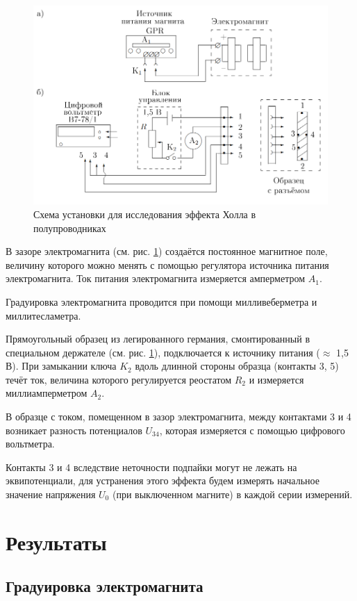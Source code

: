 \documentclass[12pt,a4paper]{article}
\newcommand{\figref}[1]{(см. рис. \ref{#1})}
\begin{document}
	\begin{figure}[h]
		\includegraphics[scale=0.65]{res/scheme.png}
		\caption{Схема установки для исследования эффекта Холла в полупроводниках}
		\label{scheme}
	\end{figure}
	
	В зазоре электромагнита \figref{scheme} создаётся постоянное магнитное поле, величину которого можно менять с помощью регуля­тора источника питания электромагнита. Ток питания электромагни­та измеряется амперметром $A_1$.
	
	Градуировка электромагнита проводится при помощи милливеберметра и миллитесламетра.
	
	Прямоугольный образец из легированного германия, смонтирован­ный в специальном держателе \figref{scheme}, подключается к источнику пита­ния ($\approx$ 1,5 В). При замыкании ключа $K_2$ вдоль длинной стороны образца (контакты 3, 5) течёт ток, величина которого регулируется реостатом $R_2$ и измеряется миллиамперметром $A_2$.
	
	В образце с током, помещенном в зазор электромагнита, между контактами 3 и 4 возникает разность потенциалов $U_{34}$, которая измеряется с помощью цифрового вольтметра.
	
	Контакты 3 и 4 вследствие неточности подпайки могут не лежать на эквипотенциали, для устранения этого эффекта будем измерять начальное значение напряжения $U_0$ (при выключенном магните) в каждой серии измерений.

	\section*{Результаты}
	
	\subsection*{Градуировка электромагнита}
	
\end{document}
